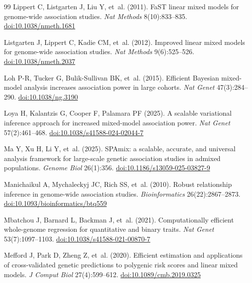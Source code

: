 \documentclass[11pt]{article}
\begin{document}
\begin{thebibliography}{99}
Lippert C, Listgarten J, Liu Y, et~al. (2011). FaST linear mixed models
for genome-wide association studies. \emph{Nat Methods} 8(10):833--835.
\href{https://doi.org/10.1038/nmeth.1681}{doi:10.1038/nmeth.1681}

Listgarten J, Lippert C, Kadie CM, et~al. (2012). Improved linear mixed
models for genome-wide association studies. \emph{Nat Methods}
9(6):525--526.
\href{https://doi.org/10.1038/nmeth.2037}{doi:10.1038/nmeth.2037}

Loh P-R, Tucker G, Bulik-Sullivan BK, et~al. (2015). Efficient Bayesian
mixed-model analysis increases association power in large cohorts.
\emph{Nat Genet} 47(3):284--290.
\href{https://doi.org/10.1038/ng.3190}{doi:10.1038/ng.3190}


Loya H, Kalantzis G, Cooper F, Palamara PF (2025). A scalable
variational inference approach for increased mixed-model association
power. \emph{Nat Genet} 57(2):461--468.
\href{https://doi.org/10.1038/s41588-024-02044-7}{doi:10.1038/s41588-024-02044-7}

Ma Y, Xu H, Li Y, et~al. (2025). SPAmix: a scalable, accurate, and
universal analysis framework for large-scale genetic association studies in
admixed populations. \emph{Genome Biol} 26(1):356.
\href{https://doi.org/10.1186/s13059-025-03827-9}{doi:10.1186/s13059-025-03827-9}

Manichaikul A, Mychaleckyj JC, Rich SS, et~al. (2010). Robust
relationship inference in genome-wide association studies.
\emph{Bioinformatics} 26(22):2867--2873.
\href{https://doi.org/10.1093/bioinformatics/btq559}{doi:10.1093/bioinformatics/btq559}

Mbatchou J, Barnard L, Backman J, et~al. (2021). Computationally
efficient whole-genome regression for quantitative and binary traits.
\emph{Nat Genet} 53(7):1097--1103.
\href{https://doi.org/10.1038/s41588-021-00870-7}{doi:10.1038/s41588-021-00870-7}

Mefford J, Park D, Zheng Z, et~al. (2020). Efficient estimation and
applications of cross-validated genetic predictions to polygenic risk
scores and linear mixed models. \emph{J Comput Biol} 27(4):599--612.
\href{https://doi.org/10.1089/cmb.2019.0325}{doi:10.1089/cmb.2019.0325}


\end{thebibliography}
\end{document}
